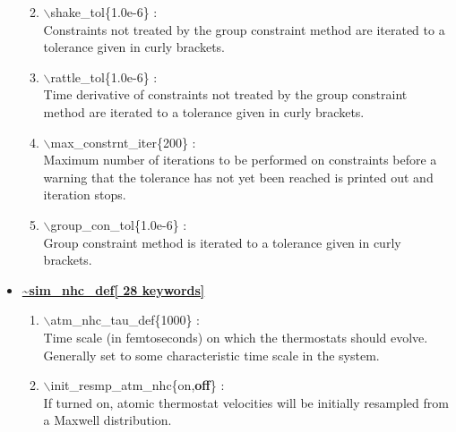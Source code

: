\begin{itemize}
\begin{enumerate}
 \vspace{0.15in} \Large
 \item   $\backslash$shake\_tol\{1.0e-6\} : \\
    \large
     Constraints not treated by the group constraint method are iterated to a
     tolerance given in curly brackets.


 \vspace{0.15in} \Large
 \item   $\backslash$rattle\_tol\{1.0e-6\} : \\
    \large
      Time derivative of constraints not treated by the group constraint 
      method are iterated to a tolerance given in curly brackets.


 \vspace{0.15in} \Large
 \item   $\backslash$max\_constrnt\_iter\{200\} : \\
    \large
     Maximum number of iterations to be performed on constraints before a 
     warning that the tolerance has not yet been reached is printed out and 
     iteration stops.

 \vspace{0.15in} \Large
 \item   $\backslash$group\_con\_tol\{1.0e-6\} : \\
    \large
     Group constraint method is iterated to a tolerance given in curly 
     brackets.

\end{enumerate}

\clearpage
\huge
\item[] \underline{\bf \~{}sim\_nhc\_def[ 28 keywords]}
\begin{enumerate}

 \vspace{0.15in} \Large
 \item   $\backslash$atm\_nhc\_tau\_def\{1000\} : \\
 \large
  Time scale (in femtoseconds) on which the thermostats should evolve. 
  Generally set to some characteristic time scale in the system.

 \vspace{0.15in} \Large
 \item   $\backslash$init\_resmp\_atm\_nhc\{on,{\bf off}\} : \\
  \large
   If turned on, atomic thermostat velocities will be initially resampled from
   a Maxwell distribution.


\end{enumerate}
\end{itemize}
